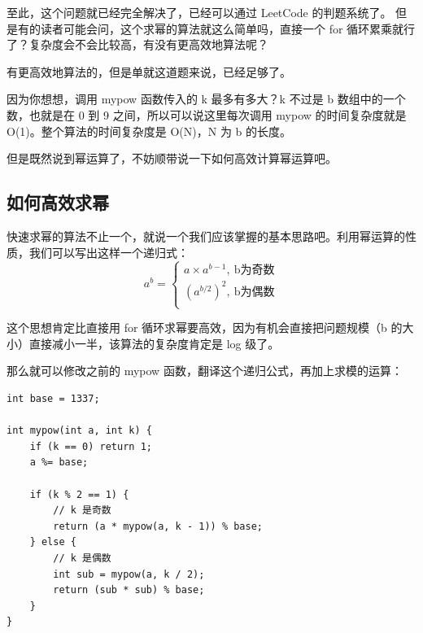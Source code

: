 \documentclass[12pt]{article}
\begin{document}
至此，这个问题就已经完全解决了，已经可以通过 LeetCode 的判题系统了。
但是有的读者可能会问，这个求幂的算法就这么简单吗，直接一个 for 循环累乘就行了？复杂度会不会比较高，有没有更高效地算法呢？

有更高效地算法的，但是单就这道题来说，已经足够了。

因为你想想，调用 mypow 函数传入的 k 最多有多大？k 不过是 b 数组中的一个数，也就是在 0 到 9 之间，所以可以说这里每次调用 mypow 的时间复杂度就是 O(1)。整个算法的时间复杂度是 O(N)，N 为 b 的长度。

但是既然说到幂运算了，不妨顺带说一下如何高效计算幂运算吧。

\subsection{如何高效求幂}
快速求幂的算法不止一个，就说一个我们应该掌握的基本思路吧。利用幂运算的性质，我们可以写出这样一个递归式：
$$
a^b = \begin{cases}
a \times a ^{b-1}, \ \text{b为奇数} \\
(a^{b/2})^2, \ \text{b为偶数} \\
\end{cases}
$$

这个思想肯定比直接用 for 循环求幂要高效，因为有机会直接把问题规模（b 的大小）直接减小一半，该算法的复杂度肯定是 log 级了。

那么就可以修改之前的 mypow 函数，翻译这个递归公式，再加上求模的运算：
\begin{lstlisting}
int base = 1337;

int mypow(int a, int k) {
    if (k == 0) return 1;
    a %= base;

    if (k % 2 == 1) {
        // k 是奇数
        return (a * mypow(a, k - 1)) % base;
    } else {
        // k 是偶数
        int sub = mypow(a, k / 2);
        return (sub * sub) % base;
    }
}
\end{lstlisting}




\end{document}

